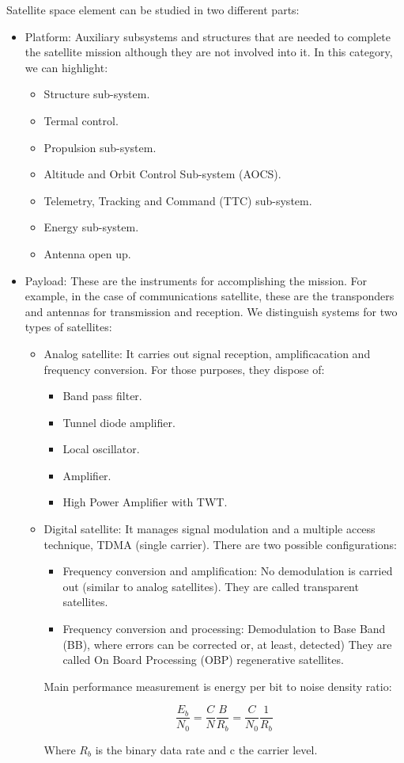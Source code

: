 \documentclass[../main.tex]{subfiles}
\begin{document}
Satellite space element can be studied in two different parts:
\begin{itemize}
	\item {
		Platform: Auxiliary subsystems and structures that are needed to complete the satellite mission although they are not involved into it. In this category, we can highlight:
		\begin{itemize}
			\item Structure sub-system.
			\item Termal control.
			\item Propulsion sub-system.
			\item Altitude and Orbit Control Sub-system (AOCS).
			\item Telemetry, Tracking and Command (TTC) sub-system.
			\item Energy sub-system.
			\item Antenna open up.
		\end{itemize}
	}
	\item {
		Payload: These are the instruments for accomplishing the mission. For example, in the case of communications satellite, these are the transponders and antennas for transmission and reception. We distinguish systems for two types of satellites:
		\begin{itemize}
			\item {
				Analog satellite: It carries out signal reception, amplificacation and frequency conversion. For those purposes, they dispose of:
				\begin{itemize}
					\item Band pass filter.
					\item Tunnel diode amplifier.
					\item Local oscillator.
					\item Amplifier.
					\item High Power Amplifier with TWT.
				\end{itemize}
			}
			\item {
				Digital satellite: It manages signal modulation and a multiple access technique, TDMA (single carrier). There are two possible configurations:
				\begin{itemize}
					\item Frequency conversion and amplification: No demodulation  is carried out (similar to analog satellites). They are called transparent satellites.
					\item Frequency conversion and processing: Demodulation to Base Band (BB), where errors can be corrected or, at least, detected) They are called On Board Processing (OBP) regenerative satellites.
				\end{itemize}
				Main performance measurement is energy per bit to noise density ratio:

				$$
					\frac {E_b} {N_0} = \frac {C} {N} \frac {B} {R_b} = \frac {C} {N_0} \frac {1} {R_b}
				$$

				Where $R_b$ is the binary data rate and c the carrier level.
			}
		\end{itemize}
	}
\end{itemize}
\end{document}
